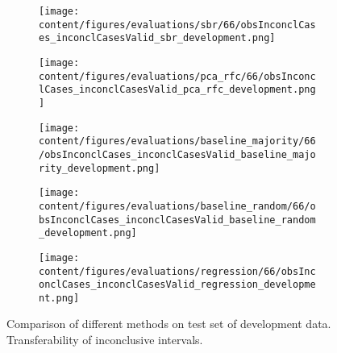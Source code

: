 \begin{figure}[ht]
  \begin{subfigure}{0.45\textwidth}
    \centering
    \texttt{[image: content/figures/evaluations/sbr/66/obsInconclCases\_inconclCasesValid\_sbr\_development.png]}
  \end{subfigure}
  \hfill
  \begin{subfigure}{0.45\textwidth}
    \centering
    \texttt{[image: content/figures/evaluations/pca\_rfc/66/obsInconclCases\_inconclCasesValid\_pca\_rfc\_development.png]}
  \end{subfigure}
  \hfill
  \begin{subfigure}{0.45\textwidth}
    \centering
    \texttt{[image: content/figures/evaluations/baseline\_majority/66/obsInconclCases\_inconclCasesValid\_baseline\_majority\_development.png]}
  \end{subfigure}
  \hfill
  \begin{subfigure}{0.45\textwidth}
    \centering
    \texttt{[image: content/figures/evaluations/baseline\_random/66/obsInconclCases\_inconclCasesValid\_baseline\_random\_development.png]}
  \end{subfigure}
  \hfill
  \begin{subfigure}{0.45\textwidth}
    \centering
    \texttt{[image: content/figures/evaluations/regression/66/obsInconclCases\_inconclCasesValid\_regression\_development.png]}
  \end{subfigure}

  \caption{Comparison of different methods on test set of development data. Transferability of inconclusive intervals.}
  \label{fig:test_interval_match_dev}
\end{figure}


